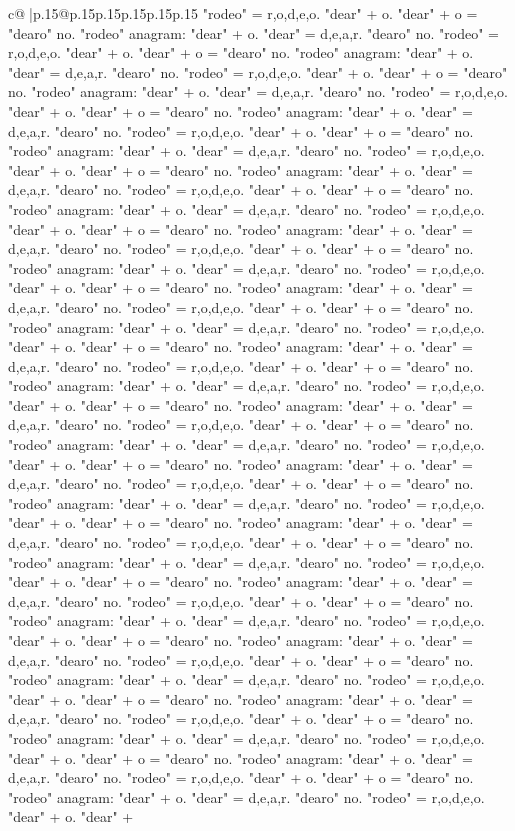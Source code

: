 \documentclass{article}
\begin{document}
{\begin{supertabular}{c@{$\;$}|p{.15\linewidth}@{}p{.15\linewidth}p{.15\linewidth}p{.15\linewidth}p{.15\linewidth}p{.15\linewidth}}
{{{"rodeo" = r,o,d,e,o. "dear" + o. "dear" + o = "dearo" no. "rodeo" anagram: "dear" + o. "dear" = d,e,a,r. "dearo" no. "rodeo" = r,o,d,e,o. "dear" + o. "dear" + o = "dearo" no. "rodeo" anagram: "dear" + o. "dear" = d,e,a,r. "dearo" no. "rodeo" = r,o,d,e,o. "dear" + o. "dear" + o = "dearo" no. "rodeo" anagram: "dear" + o. "dear" = d,e,a,r. "dearo" no. "rodeo" = r,o,d,e,o. "dear" + o. "dear" + o = "dearo" no. "rodeo" anagram: "dear" + o. "dear" = d,e,a,r. "dearo" no. "rodeo" = r,o,d,e,o. "dear" + o. "dear" + o = "dearo" no. "rodeo" anagram: "dear" + o. "dear" = d,e,a,r. "dearo" no. "rodeo" = r,o,d,e,o. "dear" + o. "dear" + o = "dearo" no. "rodeo" anagram: "dear" + o. "dear" = d,e,a,r. "dearo" no. "rodeo" = r,o,d,e,o. "dear" + o. "dear" + o = "dearo" no. "rodeo" anagram: "dear" + o. "dear" = d,e,a,r. "dearo" no. "rodeo" = r,o,d,e,o. "dear" + o. "dear" + o = "dearo" no. "rodeo" anagram: "dear" + o. "dear" = d,e,a,r. "dearo" no. "rodeo" = r,o,d,e,o. "dear" + o. "dear" + o = "dearo" no. "rodeo" anagram: "dear" + o. "dear" = d,e,a,r. "dearo" no. "rodeo" = r,o,d,e,o. "dear" + o. "dear" + o = "dearo" no. "rodeo" anagram: "dear" + o. "dear" = d,e,a,r. "dearo" no. "rodeo" = r,o,d,e,o. "dear" + o. "dear" + o = "dearo" no. "rodeo" anagram: "dear" + o. "dear" = d,e,a,r. "dearo" no. "rodeo" = r,o,d,e,o. "dear" + o. "dear" + o = "dearo" no. "rodeo" anagram: "dear" + o. "dear" = d,e,a,r. "dearo" no. "rodeo" = r,o,d,e,o. "dear" + o. "dear" + o = "dearo" no. "rodeo" anagram: "dear" + o. "dear" = d,e,a,r. "dearo" no. "rodeo" = r,o,d,e,o. "dear" + o. "dear" + o = "dearo" no. "rodeo" anagram: "dear" + o. "dear" = d,e,a,r. "dearo" no. "rodeo" = r,o,d,e,o. "dear" + o. "dear" + o = "dearo" no. "rodeo" anagram: "dear" + o. "dear" = d,e,a,r. "dearo" no. "rodeo" = r,o,d,e,o. "dear" + o. "dear" + o = "dearo" no. "rodeo" anagram: "dear" + o. "dear" = d,e,a,r. "dearo" no. "rodeo" = r,o,d,e,o. "dear" + o. "dear" + o = "dearo" no. "rodeo" anagram: "dear" + o. "dear" = d,e,a,r. "dearo" no. "rodeo" = r,o,d,e,o. "dear" + o. "dear" + o = "dearo" no. "rodeo" anagram: "dear" + o. "dear" = d,e,a,r. "dearo" no. "rodeo" = r,o,d,e,o. "dear" + o. "dear" + o = "dearo" no. "rodeo" anagram: "dear" + o. "dear" = d,e,a,r. "dearo" no. "rodeo" = r,o,d,e,o. "dear" + o. "dear" + o = "dearo" no. "rodeo" anagram: "dear" + o. "dear" = d,e,a,r. "dearo" no. "rodeo" = r,o,d,e,o. "dear" + o. "dear" + o = "dearo" no. "rodeo" anagram: "dear" + o. "dear" = d,e,a,r. "dearo" no. "rodeo" = r,o,d,e,o. "dear" + o. "dear" + o = "dearo" no. "rodeo" anagram: "dear" + o. "dear" = d,e,a,r. "dearo" no. "rodeo" = r,o,d,e,o. "dear" + o. "dear" + o = "dearo" no. "rodeo" anagram: "dear" + o. "dear" = d,e,a,r. "dearo" no. "rodeo" = r,o,d,e,o. "dear" + o. "dear" + o = "dearo" no. "rodeo" anagram: "dear" + o. "dear" = d,e,a,r. "dearo" no. "rodeo" = r,o,d,e,o. "dear" + o. "dear" + o = "dearo" no. "rodeo" anagram: "dear" + o. "dear" = d,e,a,r. "dearo" no. "rodeo" = r,o,d,e,o. "dear" + o. "dear" + o = "dearo" no. "rodeo" anagram: "dear" + o. "dear" = d,e,a,r. "dearo" no. "rodeo" = r,o,d,e,o. "dear" + o. "dear" + o = "dearo" no. "rodeo" anagram: "dear" + o. "dear" = d,e,a,r. "dearo" no. "rodeo" = r,o,d,e,o. "dear" + o. "dear" + }}}
\end{supertabular}}
\end{document}
